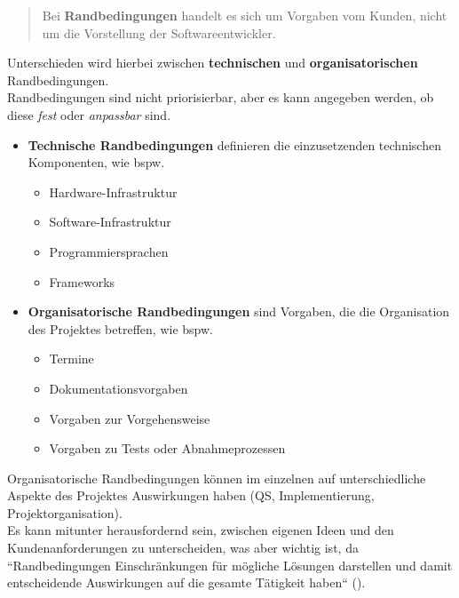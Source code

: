 \vspace{5mm}
\begin{tcolorbox}
    \blockquote[{\cite[65, Hervorhebung eigene]{Wed09}}]{
        Bei \textbf{Randbedingungen} handelt es sich um Vorgaben vom Kunden, nicht um die Vorstellung der Softwareentwickler.
    }
\end{tcolorbox}
\vspace{5mm}

\noindent
Unterschieden wird hierbei zwischen \textbf{technischen} und \textbf{organisatorischen} Randbedingungen.\\

\noindent
Randbedingungen sind nicht priorisierbar, aber es kann angegeben werden, ob diese \textit{fest} oder \textit{anpassbar} sind.

\begin{itemize}
    \item \textbf{Technische Randbedingungen} definieren die einzusetzenden technischen Komponenten, wie bspw.
        \begin{itemize}
            \item Hardware-Infrastruktur
            \item Software-Infrastruktur
            \item Programmiersprachen
            \item Frameworks
        \end{itemize}
    \item \textbf{Organisatorische Randbedingungen} sind Vorgaben, die die Organisation des Projektes betreffen, wie bspw.
    \begin{itemize}
        \item Termine
        \item Dokumentationsvorgaben
        \item Vorgaben zur Vorgehensweise
        \item Vorgaben zu Tests oder Abnahmeprozessen
    \end{itemize}
\end{itemize}

\noindent
Organisatorische Randbedingungen können im einzelnen auf unterschiedliche Aspekte des Projektes Auswirkungen haben (QS, Implementierung, Projektorganisation).\\

\noindent
Es kann mitunter herausfordernd sein, zwischen eigenen Ideen und den Kundenanforderungen zu unterscheiden, was aber wichtig ist, da ``Randbedingungen Einschränkungen für mögliche Lösungen darstellen und damit entscheidende Auswirkungen auf die gesamte Tätigkeit haben`` (\cite[65]{Wed09}).